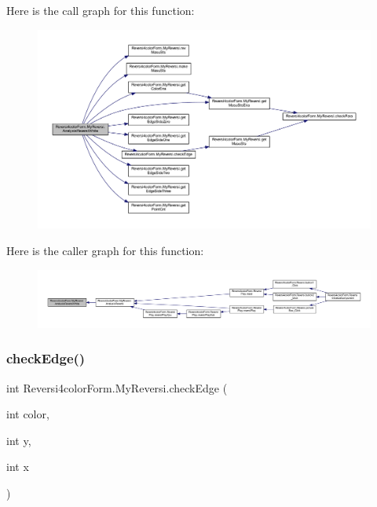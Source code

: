 Here is the call graph for this function\+:\nopagebreak
\begin{figure}[H]
\begin{center}
\leavevmode
\includegraphics[width=350pt]{class_reversi4color_form_1_1_my_reversi_a61ca891ff78c7357ab077ce7bd3cbf97_cgraph}
\end{center}
\end{figure}
Here is the caller graph for this function\+:\nopagebreak
\begin{figure}[H]
\begin{center}
\leavevmode
\includegraphics[width=350pt]{class_reversi4color_form_1_1_my_reversi_a61ca891ff78c7357ab077ce7bd3cbf97_icgraph}
\end{center}
\end{figure}
\mbox{\label{class_reversi4color_form_1_1_my_reversi_a8538a52d715eb754c49fc5719390d035}} 
\subsubsection{\texorpdfstring{check\+Edge()}{checkEdge()}}
{\footnotesize\ttfamily int Reversi4color\+Form.\+My\+Reversi.\+check\+Edge (\begin{DoxyParamCaption}\item[{int}]{color,  }\item[{int}]{y,  }\item[{int}]{x }\end{DoxyParamCaption})}



